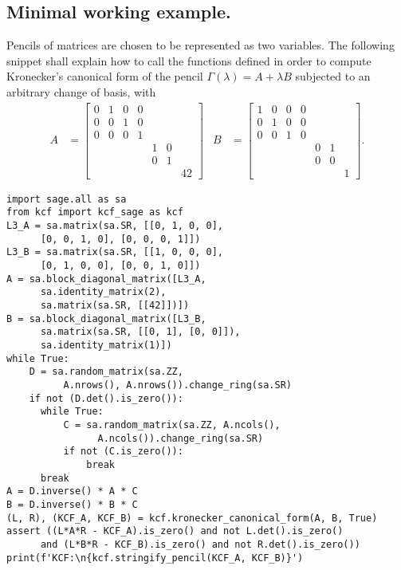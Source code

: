 \subsection*{Minimal working example.}
Pencils of matrices are chosen to be represented as two variables. The following snippet shall explain how to
call the functions defined in order to compute Kronecker's canonical form of the pencil
\(\Gamma(\lambda) = A + \lambda B\) subjected to an arbitrary change of basis, with
\begin{align*}
    A &=
    \begin{bmatrix}
        0 & 1 & 0 & 0 \\
        0 & 0 & 1 & 0 \\
        0 & 0 & 0 & 1 \\
        & & & & 1 & 0 \\
        & & & & 0 & 1 \\
        & & & & & & 42
    \end{bmatrix} &
    B &=
    \begin{bmatrix}
        1 & 0 & 0 & 0 \\
        0 & 1 & 0 & 0 \\
        0 & 0 & 1 & 0 \\
        & & & & 0 & 1 \\
        & & & & 0 & 0 \\
        & & & & & & 1
    \end{bmatrix}.
\end{align*}
\begin{verbatim}
import sage.all as sa
from kcf import kcf_sage as kcf
L3_A = sa.matrix(sa.SR, [[0, 1, 0, 0],
      [0, 0, 1, 0], [0, 0, 0, 1]])
L3_B = sa.matrix(sa.SR, [[1, 0, 0, 0],
      [0, 1, 0, 0], [0, 0, 1, 0]])
A = sa.block_diagonal_matrix([L3_A,
      sa.identity_matrix(2),
      sa.matrix(sa.SR, [[42]])])
B = sa.block_diagonal_matrix([L3_B,
      sa.matrix(sa.SR, [[0, 1], [0, 0]]),
      sa.identity_matrix(1)])
while True:
    D = sa.random_matrix(sa.ZZ,
          A.nrows(), A.nrows()).change_ring(sa.SR)
    if not (D.det().is_zero()):
      while True:
          C = sa.random_matrix(sa.ZZ, A.ncols(),
                A.ncols()).change_ring(sa.SR)
          if not (C.is_zero()):
              break
      break
A = D.inverse() * A * C
B = D.inverse() * B * C
(L, R), (KCF_A, KCF_B) = kcf.kronecker_canonical_form(A, B, True)
assert ((L*A*R - KCF_A).is_zero() and not L.det().is_zero()
      and (L*B*R - KCF_B).is_zero() and not R.det().is_zero())
print(f'KCF:\n{kcf.stringify_pencil(KCF_A, KCF_B)}')
\end{verbatim}